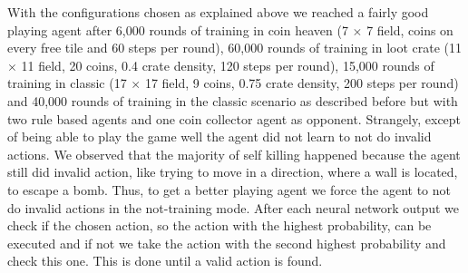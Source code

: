 With the configurations chosen as explained above we reached a fairly good playing agent after 6,000 rounds of training in coin heaven (7 $\times$ 7 field, coins on every free tile and 60 steps per round), 60,000 rounds of training in loot crate (11 $\times$ 11 field, 20 coins, 0.4 crate density, 120 steps per round), 15,000 rounds of training in classic (17 $\times$ 17 field, 9 coins, 0.75 crate density, 200 steps per round) and 40,000 rounds of training in the classic scenario as described before but with two rule based agents and one coin collector agent as opponent. Strangely, except of being able to play the game well the agent did not learn to not do invalid actions. We observed that the majority of self killing happened because the agent still did invalid action, like trying to move in a direction, where a wall is located, to escape a bomb. Thus, to get a better playing agent we force the agent to not do invalid actions in the not-training mode. After each neural network output we check if the chosen action, so the action with the highest probability, can be executed and if not we take the action with the second highest probability and check this one. This is done until a valid action is found. \\

